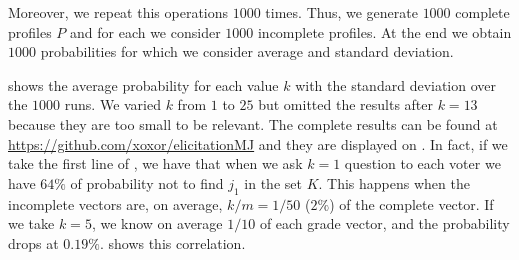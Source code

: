 	Moreover, we repeat this operations $1000$ times. Thus, we generate $1000$ complete profiles $P$ and for each we consider $1000$ incomplete profiles. At the end we obtain $1000$ probabilities for which we consider average and standard deviation.
	
	 shows the average probability for each value $k$ with the standard deviation over the $1000$ runs. We varied $k$ from $1$ to $25$ but omitted the results after $k=13$ because they are too small to be relevant. The complete results can be found at \url{https://github.com/xoxor/elicitationMJ} and they are displayed on . 
	In fact, if we take the first line of , we have that when we ask $k=1$ question to each voter we have $64\%$ of probability not to find $j_1$ in the set $K$. This happens when the incomplete vectors are, on average, $k/m=1/50$ ($2\%$) of the complete vector. If we take $k=5$, we know on average $1/10$ of each grade vector, and the probability drops at $0.19\%$.  shows this correlation.
	
